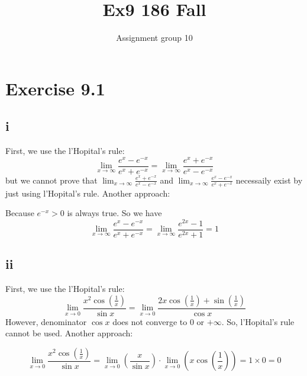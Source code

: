 \documentclass[11pt,twoside,a4paper]{article}
\begin{document}
\title{Ex9 186 Fall}
\author{Assignment group 10}
\date{}
\maketitle
\section{Exercise 9.1}
\subsection{i}
First, we use the l'Hopital's rule:
$$ \lim_{x \to \infty} \frac{e^x-e^{-x}}{e^x+e^{-x}}
    =\lim_{x \to \infty} \frac{e^x+e^{-x}}{e^x-e^{-x}} $$
but we cannot prove that
$\displaystyle \lim_{x \to \infty} \frac{e^x+e^{-x}}{e^x-e^{-x}}$
and $\displaystyle \lim_{x \to \infty} \frac{e^x-e^{-x}}{e^x+e^{-x}}$
necessaily exist by just using l'Hopital's rule.
\newline
Another approach:
\par
Because $e^{-x}>0 $ is always true. So we have
$$\lim_{x \to \infty} \frac{e^x-e^{-x}}{e^x+e^{-x}}
    =\lim_{x \to \infty} \frac{e^{2x}-1}{e^{2x}+1}=1 $$

\subsection{ii}
First, we use the l'Hopital's rule:
$$ \lim_{x \to 0} \frac{x^2\cos (\frac{1}{x})}{\sin x}
    =\lim_{x \to 0} \frac{2x\cos (\frac{1}{x})+\sin (\frac{1}{x}) }{\cos x} $$
However, denominator $\cos x$ does not converge to $0$ or $+\infty$.
So, l'Hopital's rule cannot be used.
\newline
Another approach:
\par
$$ \lim_{x \to 0} \frac{x^2\cos (\frac{1}{x})}{\sin x}
    =\lim_{x \to 0} (\frac{x}{\sin x})\cdot \lim_{x \to 0} (x\cos(\frac{1}{x}))=1\times 0=0$$
\end{document}
